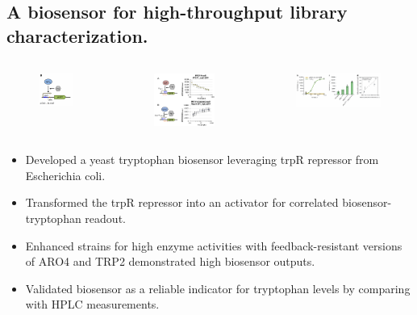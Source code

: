 \documentclass{beamer}
\begin{document}
\subsection{A biosensor for high-throughput library characterization.}
\begin{frame}{}
		\begin{columns}
	    \begin{figure}
		\flushleft
		\includegraphics[width=2cm]{pic/图片10.pdf} 
 	    \end{figure}
	    \begin{figure}
		\flushleft
		\includegraphics[width=3.6cm]{pic/图片11.pdf}
 	    \end{figure}
	    \begin{figure}
		\flushleft
		\includegraphics[width=5cm]{pic/图片12.pdf}
 	    \end{figure}
        \end{columns}


    \begin{itemize} [<+-| alert@+>] %
        \item\scriptsize Developed a yeast tryptophan biosensor leveraging trpR repressor from Escherichia coli. 
        \item\scriptsize Transformed the trpR repressor into an activator for correlated biosensor-tryptophan readout.
        \item\scriptsize Enhanced strains for high enzyme activities with feedback-resistant versions of ARO4 and TRP2 demonstrated high biosensor outputs.
        \item\scriptsize Validated biosensor as a reliable indicator for tryptophan levels by comparing with HPLC measurements.       
    \end{itemize}  
\end{frame}
\end{document}

